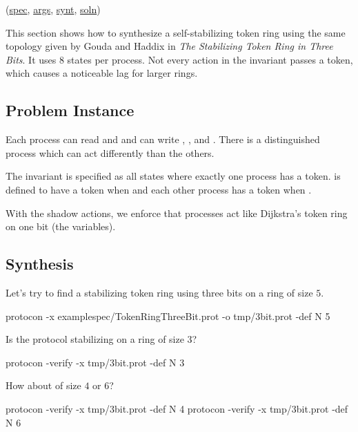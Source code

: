 (\href{\examplespec/TokenRingThreeBit.prot}{spec},
\href{\examplesett/TokenRingThreeBit.args}{args},
\href{\examplesynt/TokenRingThreeBit.prot}{synt},
\href{\examplesoln/TokenRingThreeBit.prot}{soln})

This section shows how to synthesize a self-stabilizing token ring using the same topology given by
Gouda and Haddix in \textit{The Stabilizing Token Ring in Three Bits}.
It uses 8 states per process.
Not every action in the invariant passes a token, which causes a noticeable lag for larger rings.

\subsection{Problem Instance}


Each process can read  and  and can write , , and .
There is a distinguished process  which can act differently than the others.

The invariant is specified as all states where exactly one process has a token.
 is defined to have a token when  and each other  process has a token when .

With the shadow actions, we enforce that processes act like Dijkstra's token ring on one bit (the  variables).

\subsection{Synthesis}

Let's try to find a stabilizing token ring using three bits on a ring of size $5$.
\begin{code}
protocon -x examplespec/TokenRingThreeBit.prot -o tmp/3bit.prot -def N 5
\end{code}

Is the protocol stabilizing on a ring of size $3$?
\begin{code}
protocon -verify -x tmp/3bit.prot -def N 3
\end{code}

How about of size $4$ or $6$?
\begin{code}
protocon -verify -x tmp/3bit.prot -def N 4
protocon -verify -x tmp/3bit.prot -def N 6
\end{code}

